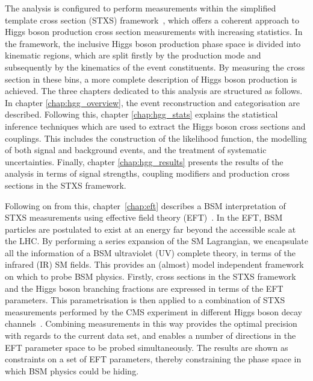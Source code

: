 The \Hgg analysis is configured to perform measurements within the simplified template cross section (STXS) framework~\cite{deFlorian:2016spz}, which offers a coherent approach to Higgs boson production cross section measurements with increasing statistics. In the framework, the inclusive Higgs boson production phase space is divided into kinematic regions, which are split firstly by the production mode and subsequently by the kinematics of the event constituents. By measuring the cross section in these bins, a more complete description of Higgs boson production is achieved. The three chapters dedicated to this analysis are structured as follows. In chapter \ref{chap:hgg_overview}, the event reconstruction and categorisation are described. Following this, chapter \ref{chap:hgg_stats} explains the statistical inference techniques which are used to extract the Higgs boson cross sections and couplings. This includes the construction of the likelihood function, the modelling of both signal and background events, and the treatment of systematic uncertainties. Finally, chapter \ref{chap:hgg_results} presents the results of the analysis in terms of signal strengths, coupling modifiers and production cross sections in the STXS framework.

Following on from this, chapter~\ref{chap:eft} describes a BSM interpretation of STXS measurements using effective field theory (EFT)~\cite{BUCHMULLER1986621,Hagiwara:1993qt,Giudice_2007,Grzadkowski2010,Contino:2013kra}. In the EFT, BSM particles are postulated to exist at an energy far beyond the accessible scale at the LHC. By performing a series expansion of the SM Lagrangian, we encapsulate all the information of a BSM ultraviolet (UV) complete theory, in terms of the infrared (IR) SM fields. This provides an (almost) model independent framework on which to probe BSM physics. Firstly, cross sections in the STXS framework and the Higgs boson branching fractions are expressed in terms of the EFT parameters. This parametrisation is then applied to a combination of STXS measurements performed by the CMS experiment in different Higgs boson decay channels~\cite{CMS-PAS-HIG-19-005}. Combining measurements in this way provides the optimal precision with regards to the current data set, and enables a number of directions in the EFT parameter space to be probed simultaneously. The results are shown as constraints on a set of EFT parameters, thereby constraining the phase space in which BSM physics could be hiding.

